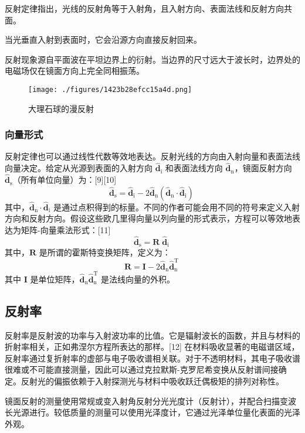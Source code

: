 反射定律指出，光线的反射角等于入射角，且入射方向、表面法线和反射方向共面。

当光垂直入射到表面时，它会沿源方向直接反射回来。

反射现象源自平面波在平坦边界上的衍射。当边界的尺寸远大于波长时，边界处的电磁场仅在镜面方向上完全同相振荡。
\begin{figure}[ht]
\centering
\texttt{[image: ./figures/1423b28efcc15a4d.png]}
\caption{大理石球的漫反射} \label{fig_JMFS_4}
\end{figure}
\subsubsection{向量形式}
反射定律也可以通过线性代数等效地表达。反射光线的方向由入射向量和表面法线向量决定。给定从光源到表面的入射方向 \(\mathbf {\hat {d}}_{\mathrm {i}}\) 和表面法线方向 \(\mathbf {\hat {d}}_{\mathrm {n}}\)，镜面反射方向 \(\mathbf {\hat {d}}_{\mathrm {s}}\)（所有单位向量）为：[9][10]
\[
\mathbf {\hat {d}}_{\mathrm {s}} = \mathbf {\hat {d}}_{\mathrm {i}} - 2 \mathbf {\hat {d}}_{\mathrm {n}} \left( \mathbf {\hat {d}}_{\mathrm {n}} \cdot \mathbf {\hat {d}}_{\mathrm {i}} \right)~
\]
其中，\(\mathbf {\hat {d}}_{\mathrm {n}} \cdot \mathbf {\hat {d}}_{\mathrm {i}}\) 是通过点积得到的标量。不同的作者可能会用不同的符号来定义入射方向和反射方向。假设这些欧几里得向量以列向量的形式表示，方程可以等效地表达为矩阵-向量乘法形式：[11]
\[
\mathbf {\hat {d}}_{\mathrm {s}} = \mathbf {R} \; \mathbf {\hat {d}}_{\mathrm {i}}~
\]
其中，\(\mathbf {R}\) 是所谓的霍斯特变换矩阵，定义为：
\[
\mathbf {R} = \mathbf {I} - 2 \mathbf {\hat {d}}_{\mathrm {n}} \mathbf {\hat {d}}_{\mathrm {n}}^{\mathrm {T}}~
\]
其中 \(\mathbf {I}\) 是单位矩阵，\(\mathbf {\hat {d}}_{\mathrm {n}} \mathbf {\hat {d}}_{\mathrm {n}}^{\mathrm {T}}\) 是法线向量的外积。
\subsection{反射率}
反射率是反射波的功率与入射波功率的比值。它是辐射波长的函数，并且与材料的折射率相关，正如弗涅尔方程所表达的那样。[12] 在材料吸收显著的电磁谱区域，反射率通过复折射率的虚部与电子吸收谱相关联。对于不透明材料，其电子吸收谱很难或不可能直接测量，因此可以通过克拉默斯-克罗尼希变换从反射谱间接确定。反射光的偏振依赖于入射探测光与材料中吸收跃迁偶极矩的排列对称性。

镜面反射的测量使用常规或变入射角反射分光光度计（反射计），并配合扫描变波长光源进行。较低质量的测量可以使用光泽度计，它通过光泽单位量化表面的光泽外观。